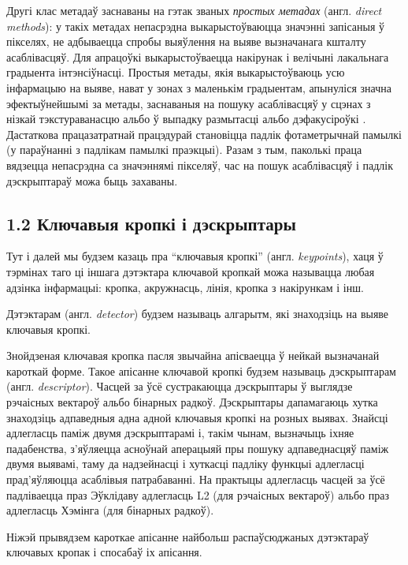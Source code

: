 Другі клас метадаў заснаваны на гэтак званых \textit{простых метадах} (англ. \textit{direct methods}): у такіх
метадах непасрэдна выкарыстоўваюцца значэнні запісаныя ў пікселях, не адбываецца спробы выяўлення на выяве вызначанага
кшталту асаблівасцяў. Для апрацоўкі выкарыстоўваецца накірунак і велічыні лакальнага градыента інтэнсіўнасці.
Простыя метады, якія выкарыстоўваюць усю інфармацыю на выяве, нават у зонах з маленькім градыентам, апынуліся значна
эфектыўнейшымі за метады, заснаваныя на пошуку асаблівасцяў у сцэнах з нізкай тэкстураванасцю альбо ў выпадку
размытасці альбо дэфакусіроўкі \cite{direct-methods}.
Дастаткова працазатратнай працэдурай становіцца падлік фотаметрычнай памылкі (у параўнанні з падлікам памылкі праэкцыі).
Разам з тым, паколькі праца вядзецца непасрэдна са значэннямі пікселяў, час на пошук асаблівасцяў і падлік дэскрыптараў можа быць захаваны.

\subsection*{1.2 Ключавыя кропкі і дэскрыптары}

Тут і далей мы будзем казаць пра ``ключавыя кропкі'' (англ. \textit{keypoints}), хаця ў тэрмінах таго ці іншага дэтэктара
ключавой кропкай можа называцца любая адзінка інфармацыі: кропка, акружнасць, лінія, кропка з накірункам і інш.

Дэтэктарам (англ. \textit{detector}) будзем называць алгарытм, які знаходзіць на выяве ключавыя кропкі.

Знойдзеная ключавая кропка пасля звычайна апісваецца ў нейкай вызначанай кароткай форме. Такое апісанне ключавой кропкі
будзем называць дэскрыптарам (англ. \textit{descriptor}). Часцей за ўсё сустракаюцца дэскрыптары ў выглядзе рэчаісных
вектароў альбо бінарных радкоў. Дэскрыптары дапамагаюць хутка знаходзіць адпаведныя адна адной ключавыя кропкі на
розных выявах. Знайсці адлегласць паміж двумя дэскрыптарамі і, такім чынам, вызначыць іхняе падабенства, з'яўляецца
асноўнай аперацыяй пры пошуку адпаведнасцяў паміж двумя выявамі, таму да надзейнасці і хуткасці падліку функцыі адлегласці
прад'яўляюцца асаблівыя патрабаванні. На практыцы адлегласць часцей за ўсё падліваецца праз Эўклідаву адлегласць L2 (для
рэчаісных вектароў) альбо праз адлегласць Хэмінга (для бінарных радкоў).

\vspace{5mm}

Ніжэй прывядзем кароткае апісанне найбольш распаўсюджаных дэтэктараў ключавых кропак і спосабаў іх апісання.

